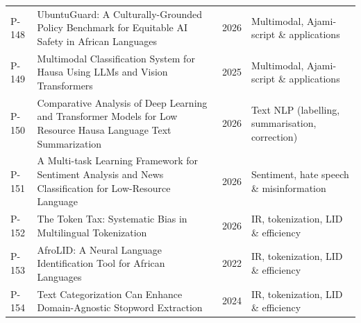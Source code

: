 \begin{longtable}{@{}p{} p{} p{} p{}@{}}
P-148 & UbuntuGuard: A Culturally-Grounded Policy Benchmark for Equitable AI Safety in African Languages & 2026 & Multimodal, Ajami-script \& applications \\
P-149 & Multimodal Classification System for Hausa Using LLMs and Vision Transformers & 2025 & Multimodal, Ajami-script \& applications \\
P-150 & Comparative Analysis of Deep Learning and Transformer Models for Low Resource Hausa Language Text Summarization & 2026 & Text NLP (labelling, summarisation, correction) \\
P-151 & A Multi-task Learning Framework for Sentiment Analysis and News Classification for Low-Resource Language & 2026 & Sentiment, hate speech \& misinformation \\
P-152 & The Token Tax: Systematic Bias in Multilingual Tokenization & 2026 & IR, tokenization, LID \& efficiency \\
P-153 & AfroLID: A Neural Language Identification Tool for African Languages & 2022 & IR, tokenization, LID \& efficiency \\
P-154 & Text Categorization Can Enhance Domain-Agnostic Stopword Extraction & 2024 & IR, tokenization, LID \& efficiency \\
\end{longtable}
